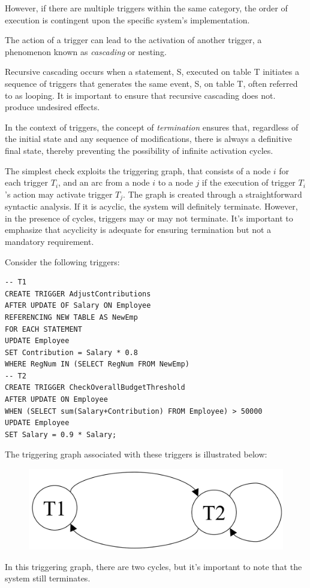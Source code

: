 \documentclass[12pt, a4paper]{report}
\begin{document}
    However, if there are multiple triggers within the same category, the order of execution is contingent upon the specific system's implementation.
    \begin{definition}
        The action of a trigger can lead to the activation of another trigger, a phenomenon known as \emph{cascading} or nesting.
    \end{definition}
    Recursive cascading occurs when a statement, S, executed on table T initiates a sequence of triggers that generates the same event, S, on table T, often referred to as looping.
    It is important to ensure that recursive cascading does not. produce undesired effects. 
    \begin{definition}
        In the context of triggers, the concept of \emph{termination} ensures that, regardless of the initial state and any sequence of modifications, there is always a definitive final state, thereby preventing the possibility of infinite activation cycles.
    \end{definition}

    The simplest check exploits the triggering graph, that consists of a node $i$ for each trigger $T_i$, and an arc from a node $i$ to a node $j$ if the execution of trigger $T_i$'s action may activate trigger $T_j$.
    The graph is created through a straightforward syntactic analysis. 
    If it is acyclic, the system will definitely terminate. 
    However, in the presence of cycles, triggers may or may not terminate. 
    It's important to emphasize that acyclicity is adequate for ensuring termination but not a mandatory requirement.
    \begin{example}
        Consider the following triggers:
        \begin{lstlisting}[style=SQL]
-- T1
CREATE TRIGGER AdjustContributions
AFTER UPDATE OF Salary ON Employee
REFERENCING NEW TABLE AS NewEmp
FOR EACH STATEMENT
UPDATE Employee
SET Contribution = Salary * 0.8
WHERE RegNum IN (SELECT RegNum FROM NewEmp)
-- T2
CREATE TRIGGER CheckOverallBudgetThreshold
AFTER UPDATE ON Employee
WHEN (SELECT sum(Salary+Contribution) FROM Employee) > 50000
UPDATE Employee
SET Salary = 0.9 * Salary; 
        \end{lstlisting}
        The triggering graph associated with these triggers is illustrated below:
        \begin{figure}[H]
            \centering
            \includegraphics[width=0.25\linewidth]{images/trig.png}
        \end{figure}
        In this triggering graph, there are two cycles, but it's important to note that the system still terminates.
    \end{example}
\end{document}
